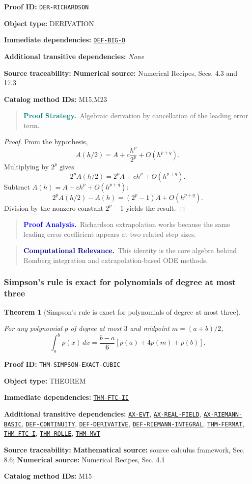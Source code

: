 \documentclass[10pt]{article}
\newcommand{\pidraw}[1]{\begingroup\urlstyle{tt}\nolinkurl{#1}\endgroup}
\newcommand{\pidref}[1]{\hyperref[prf:#1]{\pidraw{#1}}}
\newtheorem{theorem}{Theorem}[section]
\theoremstyle{definition}
\theoremstyle{remark}
\newenvironment{proofstrategy}
{\begin{quote}\small\noindent\textbf{\textcolor{teal}{Proof Strategy.}}\ }
{\end{quote}}
\newenvironment{proofanalysis}
{\begin{quote}\small\noindent\textbf{\textcolor{blue}{Proof Analysis.}}\ }
{\end{quote}}
\newenvironment{computationalrelevance}
{\begin{quote}\small\noindent\textbf{\textcolor{navy}{Computational Relevance.}}\ }
{\end{quote}}
\newcommand{\meta}[2]{\noindent\textbf{#1:} #2\par}
\begin{document}
\meta{Proof ID}{\pidraw{DER-RICHARDSON}}
\meta{Object type}{DERIVATION}
\meta{Immediate dependencies}{\pidref{DEF-BIG-O}}
\meta{Additional transitive dependencies}{\emph{None}}
\meta{Source traceability}{\textbf{Numerical source:} Numerical Recipes, Secs. 4.3 and 17.3}
\meta{Catalog method IDs}{M15,M23}

\begin{proofstrategy}Algebraic derivation by cancellation of the leading error term.\end{proofstrategy}

\begin{proof}

From the hypothesis,
\[
A(h/2)=A+c\frac{h^p}{2^p}+O(h^{p+q}).
\]
Multiplying by $2^p$ gives
\[
2^pA(h/2)=2^pA+c h^p+O(h^{p+q}).
\]
Subtract $A(h)=A+c h^p+O(h^{p+q})$:
\[
2^pA(h/2)-A(h)=(2^p-1)A+O(h^{p+q}).
\]
Division by the nonzero constant $2^p-1$ yields the result.

\end{proof}

\begin{proofanalysis}Richardson extrapolation works because the same leading error coefficient appears at two related step sizes.\end{proofanalysis}

\begin{computationalrelevance}This identity is the core algebra behind Romberg integration and extrapolation-based ODE methods.\end{computationalrelevance}

\subsubsection{Simpson's rule is exact for polynomials of degree at most three}

\begin{theorem}[Simpson's rule is exact for polynomials of degree at most three]\label{prf:THM-SIMPSON-EXACT-CUBIC}

For any polynomial $p$ of degree at most $3$ and midpoint $m=(a+b)/2$,
\[
\int_a^b p(x)\,dx
=
\frac{b-a}{6}\left[p(a)+4p(m)+p(b)\right].
\]

\end{theorem}

\meta{Proof ID}{\pidraw{THM-SIMPSON-EXACT-CUBIC}}
\meta{Object type}{THEOREM}
\meta{Immediate dependencies}{\pidref{THM-FTC-II}}
\meta{Additional transitive dependencies}{\pidref{AX-EVT}, \pidref{AX-REAL-FIELD}, \pidref{AX-RIEMANN-BASIC}, \pidref{DEF-CONTINUITY}, \pidref{DEF-DERIVATIVE}, \pidref{DEF-RIEMANN-INTEGRAL}, \pidref{THM-FERMAT}, \pidref{THM-FTC-I}, \pidref{THM-ROLLE}, \pidref{THM-MVT}}
\meta{Source traceability}{\textbf{Mathematical source:} source calculus framework, Sec. 8.6; \textbf{Numerical source:} Numerical Recipes, Sec. 4.1}
\meta{Catalog method IDs}{M15}
\end{document}
